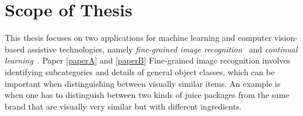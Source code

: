 


\section{Scope of Thesis}\label{sec:scope_of_thesis}

This thesis focuses on two applications for machine learning and computer vision-based assistive technologies, namely \textit{fine-grained image recognition}~\cite{wei2021fine} and \textit{continual learning}~\cite{delange2021continual, parisi2019continual}. Paper \ref{paperA} and \ref{paperB} 
Fine-grained image recognition involves identifying subcategories and details of general object classes, which can be important when distinguishing between visually similar items. An example is when one has to distinguish between two kinds of juice packages from the same brand that are visually very similar but with different ingredients. %

